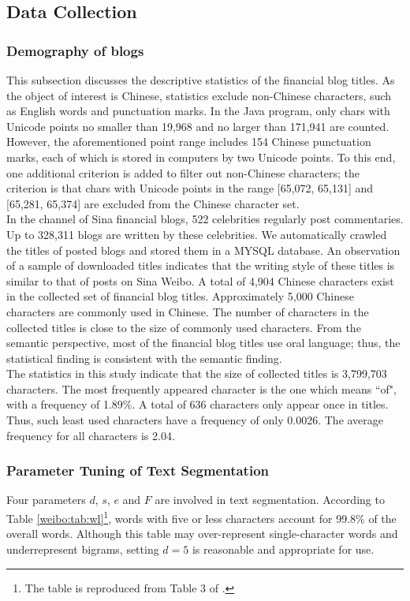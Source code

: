 \documentclass[review,3p,times,12pt,number]{elsarticle}
\begin{document}
\subsection{Data Collection}
\subsubsection{Demography of blogs}
This subsection discusses the descriptive statistics of the financial blog titles. As the object of interest is Chinese, statistics exclude non-Chinese characters, such as English words and punctuation marks. In the Java program, only chars with Unicode points no smaller than 19,968 and no larger than 171,941 are counted. However, the aforementioned point range includes 154 Chinese punctuation marks, each of which is stored in computers by two Unicode points. To this end, one additional criterion is added to filter out non-Chinese characters; the criterion is that chars with Unicode points in the range [65,072, 65,131] and [65,281, 65,374] are excluded from the Chinese character set.\\
\indent
In the channel of Sina financial blogs, 522 celebrities regularly post commentaries. Up to 328,311 blogs are written by these celebrities. We automatically crawled the titles of posted blogs and stored them in a MYSQL database. An observation of a sample of downloaded titles indicates that the writing style of these titles is similar to that of posts on Sina Weibo. A total of 4,904 Chinese characters exist in the collected set of financial blog titles. Approximately 5,000 Chinese characters are commonly used in Chinese. The number of characters in the collected titles is close to the size of commonly used characters. From the semantic perspective, most of the financial blog titles use oral language; thus, the statistical finding is consistent with the semantic finding.\\
\indent
The statistics in this study indicate that the size of collected titles is 3,799,703 characters. The most frequently appeared character is the one which means ``of", with a frequency of 1.89\%. A total of 636 characters only appear once in titles. Thus, such least used characters have a frequency of only 0.0026\textpertenthousand. The average frequency for all characters is 2.04\textpertenthousand.

\subsubsection{Parameter Tuning of Text Segmentation}
Four parameters $d$, $s$, $e$ and $F$ are involved in text segmentation. According to Table \ref{weibo:tab:wl}\footnote{The table is reproduced from Table 3 of \cite{teahan2000compression}.}, words with five or less characters account for 99.8\% of the overall words. Although this table may over-represent single-character words and underrepresent bigrams, setting $d=5$ is reasonable and appropriate for use.
\end{document}
